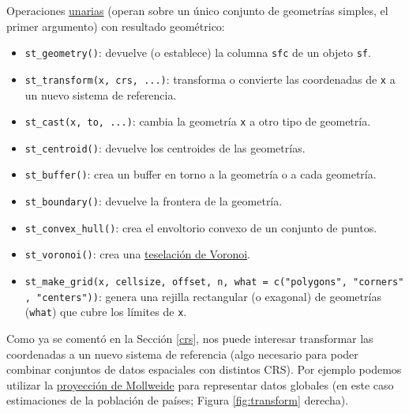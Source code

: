 \documentclass[
  spanish,
]{book}
\providecommand{\tightlist}{%
  \setlength{\itemsep}{0pt}\setlength{\parskip}{0pt}}
\theoremstyle{break}
\begin{document}
Operaciones \href{https://r-spatial.github.io/sf/reference/geos_unary.html}{unarias} (operan sobre un único conjunto de geometrías simples, el primer argumento) con resultado geométrico:

\begin{itemize}
\tightlist
\item
  \texttt{st\_geometry()}: devuelve (o establece) la columna \texttt{sfc} de un objeto \texttt{sf}.
\item
  \texttt{st\_transform(x,\ crs,\ ...)}: transforma o convierte las coordenadas de \texttt{x} a un nuevo sistema de referencia.
\item
  \texttt{st\_cast(x,\ to,\ ...)}: cambia la geometría \texttt{x} a otro tipo de geometría.
\item
  \texttt{st\_centroid()}: devuelve los centroides de las geometrías.
\item
  \texttt{st\_buffer()}: crea un buffer en torno a la geometría o a cada geometría.
\item
  \texttt{st\_boundary()}: devuelve la frontera de la geometría.
\item
  \texttt{st\_convex\_hull()}: crea el envoltorio convexo de un conjunto de puntos.
\item
  \texttt{st\_voronoi()}: crea una \href{https://en.wikipedia.org/wiki/Voronoi_diagram}{teselación de Voronoi}.
\item
  \texttt{st\_make\_grid(x,\ cellsize,\ offset,\ n,\ what\ =\ c("polygons",\ "corners",\ "centers"))}: genera una rejilla rectangular (o exagonal) de geometrías (\texttt{what}) que cubre los límites de \texttt{x}.
\end{itemize}

Como ya se comentó en la Sección \ref{crs}, nos puede interesar transformar las coordenadas a un nuevo sistema de referencia (algo necesario para poder combinar conjuntos de datos espaciales con distintos CRS).
Por ejemplo podemos utilizar la \href{https://en.wikipedia.org/wiki/Mollweide_projection}{proyección de Mollweide} para representar datos globales (en este caso estimaciones de la población de países; Figura \ref{fig:transform} derecha).
\end{document}
